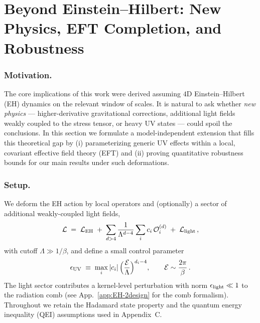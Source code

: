 \documentclass[aps,prd,preprint,onecolumn,superscriptaddress,nofootinbib,longbibliography,floatfix,11pt,showpacs,showkeys]{revtex4-2}
\theoremstyle{plain}
\theoremstyle{definition}
\theoremstyle{remark}
\begin{document}
\section{Beyond Einstein--Hilbert: New Physics, EFT Completion, and Robustness}
\label{sec:new-physics}

\subsubsection{Motivation.} The core implications of this work were derived assuming $4$D Einstein--Hilbert (EH) dynamics on the relevant window of scales. It is natural to ask whether \emph{new physics} --- higher-derivative gravitational corrections, additional light fields weakly coupled to the stress tensor, or heavy UV states --- could spoil the conclusions. In this section we formulate a model-independent extension that fills this theoretical gap by (i) parameterizing generic UV effects within a local, covariant effective field theory (EFT) and (ii) proving quantitative robustness bounds for our main results under such deformations.

\subsubsection{Setup.} We deform the EH action by local operators and (optionally) a sector of additional weakly-coupled light fields,
\begin{equation}
\mathcal{L} \;=\; \mathcal{L}_{\rm EH} \;+\; \sum_{d>4} \frac{1}{\Lambda^{d-4}} \sum_i c_i\, \mathcal{O}^{(d)}_i \;+\; \mathcal{L}_{\rm light}\,,
\end{equation}
with cutoff $\Lambda \gg 1/\beta$, and define a small control parameter
\begin{equation}
\epsilon_{\rm UV} \;\equiv\; \max_i |c_i| \,\Big(\frac{\mathcal{E}}{\Lambda}\Big)^{d_i-4}, \qquad \mathcal{E}\sim \frac{2\pi}{\beta}\,.
\end{equation}
The light sector contributes a kernel-level perturbation with norm $\epsilon_{\rm light}\ll 1$ to the radiation comb (see App.~\ref{app:EH-2design} for the comb formalism). Throughout we retain the Hadamard state property and the quantum energy inequality (QEI) assumptions used in Appendix~C.
\end{document}
